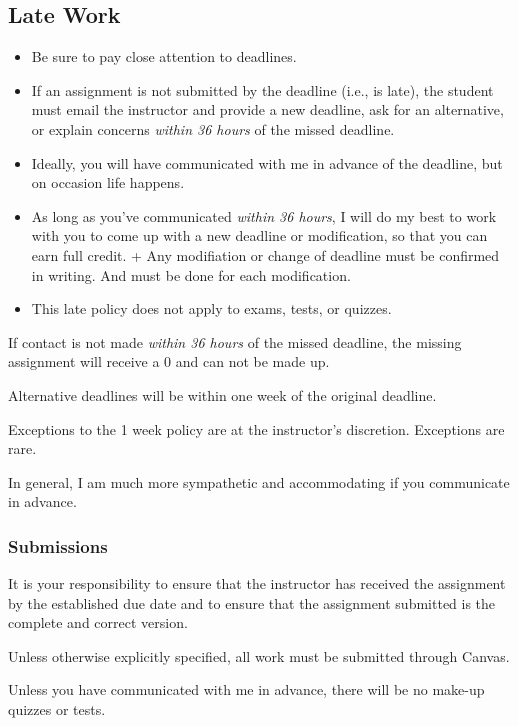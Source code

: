 \hypertarget{late-work}{%
\subsection{Late Work}\label{late-work}}

\begin{itemize}
\tightlist
\item
  Be sure to pay close attention to deadlines.
\item
  If an assignment is not submitted by the deadline (i.e., is late), the student must email the instructor and provide a new deadline, ask for an alternative, or explain concerns \emph{within 36 hours} of the missed deadline.
\item
  Ideally, you will have communicated with me in advance of the deadline, but on occasion life happens.
\item
  As long as you've communicated \emph{within 36 hours}, I will do my best to work with you to come up with a new deadline or modification, so that you can earn full credit. + Any modifiation or change of deadline must be confirmed in writing. And must be done for each modification.
\item
  This late policy does not apply to exams, tests, or quizzes.
\end{itemize}

If contact is not made \emph{within 36 hours} of the missed deadline, the missing assignment will receive a 0 and can not be made up.

Alternative deadlines will be within one week of the original deadline.

Exceptions to the 1 week policy are at the instructor's discretion. Exceptions are rare.

In general, I am much more sympathetic and accommodating if you communicate in advance.

\hypertarget{submissions}{%
\subsubsection{Submissions}\label{submissions}}

It is your responsibility to ensure that the instructor has received the assignment by the established due date and to ensure that the assignment submitted is the complete and correct version.

Unless otherwise explicitly specified, all work must be submitted through Canvas.

Unless you have communicated with me in advance, there will be no make-up quizzes or tests.

